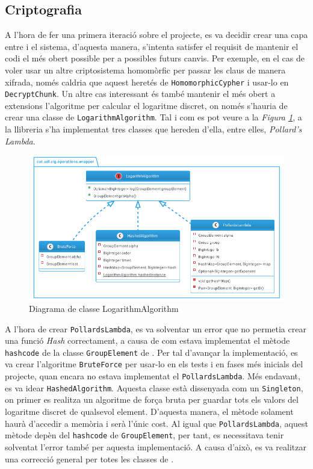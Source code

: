 \subsection{Criptografia}
A l'hora de fer una primera iteració sobre el projecte, es va decidir crear una capa entre \ciglib i el sistema, d'aquesta manera, s'intenta satisfer el requisit de mantenir el codi el més obert possible per a possibles futurs canvis. Per exemple, en el cas de voler usar un altre criptosistema homomòrfic per passar les claus de manera xifrada, només caldria que aquest heretés de \texttt{HomomorphicCypher} i usar-lo en \texttt{DecryptChunk}. Un altre cas interessant és també mantenir el més obert a extensions l'algoritme per calcular el logaritme discret, on només s'hauria de crear una classe de \texttt{LogarithmAlgorithm}. Tal i com es pot veure a la \textit{Figura \ref{fig:logarithm}}, a la llibreria \cite{ciglib} s'ha implementat tres classes que hereden d'ella, entre elles, \textit{Pollard's Lambda}.
\begin{figure}[H]
	\centering
	\includegraphics[width=15cm]{classes/log.png}
	\caption{Diagrama de classe LogarithmAlgorithm}
	\label{fig:logarithm}
\end{figure}
A l'hora de crear \texttt{PollardsLambda}, es va solventar un error que no permetia crear una funció \textit{Hash} correctament, a causa de com estava implementat el mètode \texttt{hashcode} de la classe \texttt{GroupElement} de \cite{ciglib}. Per tal d'avançar la implementació, es va crear l'algoritme \texttt{BruteForce} per usar-lo en els tests i en fases més inicials del projecte, quan encara no estava implementat el \texttt{PollardsLambda}. Més endavant, es va idear \texttt{HashedAlgorithm}. Aquesta classe està dissenyada com un \texttt{Singleton}, on primer es realitza un algoritme de força bruta per guardar tots els valors del logaritme discret de qualsevol element. D'aquesta manera, el mètode solament haurà d'accedir a memòria i serà l'únic cost. Al igual que \texttt{PollardsLambda}, aquest mètode depèn del \texttt{hashcode} de \texttt{GroupElement}, per tant, es necessitava tenir solventat l'error també per aquesta implementació. A causa d'això, es va realitzar una correcció general per totes les classes de \cite{ciglib}.
